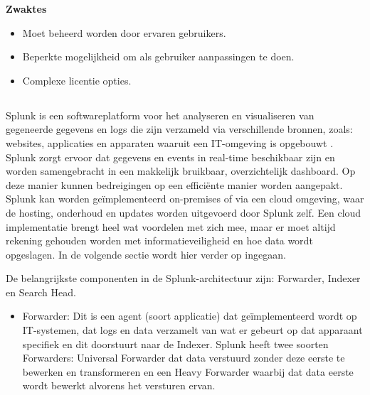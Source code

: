 \textbf{Zwaktes}

\begin{itemize}
    \item Moet beheerd worden door ervaren gebruikers.
    \item Beperkte mogelijkheid om als gebruiker aanpassingen te doen.
    \item Complexe licentie opties. 
\end{itemize}


\subsection{}

Splunk is een softwareplatform voor het analyseren en visualiseren van gegeneerde gegevens en logs die zijn verzameld via verschillende bronnen, zoals: websites, applicaties en apparaten waaruit een IT-omgeving is opgebouwt \autocite{Vardhan2020}.
Splunk zorgt ervoor dat gegevens en events in real-time beschikbaar zijn en worden samengebracht in een makkelijk bruikbaar, overzichtelijk dashboard. Op deze manier kunnen bedreigingen op een efficiënte manier worden aangepakt.
Splunk kan worden geïmplementeerd on-premises of via een cloud omgeving, waar de hosting, onderhoud en updates worden uitgevoerd door Splunk zelf. Een cloud implementatie brengt heel wat voordelen met zich mee, maar er moet altijd rekening gehouden worden met informatieveiligheid en hoe data wordt opgeslagen. In de volgende sectie wordt hier verder op ingegaan.

De belangrijkste componenten in de Splunk-architectuur zijn: Forwarder, Indexer en Search Head.

\begin{itemize}
    \item Forwarder: Dit is een agent (soort applicatie) dat geïmplementeerd wordt op IT-systemen, dat logs en data verzamelt van wat er gebeurt op dat apparaant specifiek en dit doorstuurt naar de Indexer. Splunk heeft twee soorten Forwarders: Universal Forwarder dat data verstuurd zonder deze eerste te bewerken en transformeren en een Heavy Forwarder waarbij dat data eerste wordt bewerkt alvorens het versturen ervan.
\end{itemize}









\subsection{}

